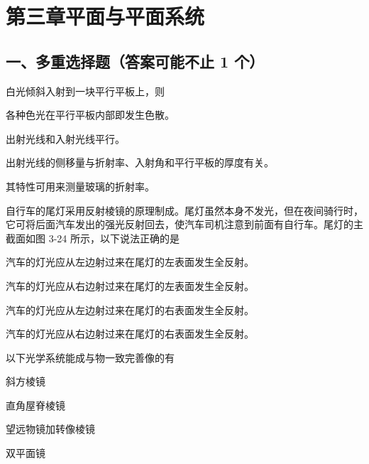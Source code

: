 \documentclass[padl, analysis, notocnum]{ExBook}
\newcommand{\answerarea}[1][3.5cm]{%
  \par\vspace{1mm}%
  \noindent{\color{themeColor!35}\rule{\linewidth}{0.4pt}}\par
  \noindent\begin{minipage}[t][#1][t]{\linewidth}\vspace{0pt}\end{minipage}\par
  \noindent{\color{themeColor!35}\rule{\linewidth}{0.4pt}}\par
}
\begin{document}
\section{第三章\quad 平面与平面系统}
\subsection{一、多重选择题（答案可能不止 1 个）}
\begin{qitems}[startnum=1]
\qitem 白光倾斜入射到一块平行平板上，则
\par\noindent\hspace{2em}各种色光在平行平板内部即发生色散。
\par\noindent\hspace{2em}出射光线和入射光线平行。
\par\noindent\hspace{2em}出射光线的侧移量与折射率、入射角和平行平板的厚度有关。
\par\noindent\hspace{2em}其特性可用来测量玻璃的折射率。
\label{q:51:start}
\answerarea[4.0cm]
\label{q:51:end}
\end{qitems}

\begin{qitems}[startnum=2]
\qitem 自行车的尾灯采用反射棱镜的原理制成。尾灯虽然本身不发光，但在夜间骑行时，它可将后面汽车发出的强光反射回去，使汽车司机注意到前面有自行车。尾灯的主截面如图 3-24 所示，以下说法正确的是
\par\noindent\hspace{2em}汽车的灯光应从左边射过来在尾灯的左表面发生全反射。
\par\noindent\hspace{2em}汽车的灯光应从右边射过来在尾灯的左表面发生全反射。
\par\noindent\hspace{2em}汽车的灯光应从左边射过来在尾灯的右表面发生全反射。
\par\noindent\hspace{2em}汽车的灯光应从右边射过来在尾灯的右表面发生全反射。
\label{q:52:start}
\answerarea[1.6cm]
\label{q:52:end}
\end{qitems}

\begin{qitems}[startnum=3]
\qitem 以下光学系统能成与物一致完善像的有
\par\noindent\hspace{2em}斜方棱镜
\par\noindent\hspace{2em}直角屋脊棱镜
\par\noindent\hspace{2em}望远物镜加转像棱镜
\par\noindent\hspace{2em}双平面镜
\label{q:53:start}
\answerarea[4.0cm]
\label{q:53:end}
\end{qitems}
\end{document}
